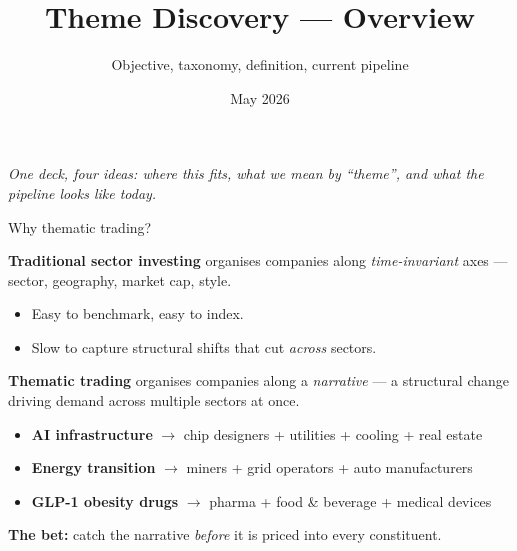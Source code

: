 \documentclass[10pt,aspectratio=169]{beamer}
\title{Theme Discovery --- Overview}
\subtitle{Objective, taxonomy, definition, current pipeline}
\date{May 2026}
\begin{document}
\begin{frame}[plain]
  \titlepage
  \vspace{-0.6cm}
  \centering\small
  \emph{One deck, four ideas: where this fits, what we mean by ``theme'',
  and what the pipeline looks like today.}
\end{frame}


\begin{frame}{Why thematic trading?}
  \footnotesize

  \textbf{Traditional sector investing} organises companies along
  \emph{time-invariant} axes --- sector, geography, market cap, style.
  \begin{itemize}\setlength\itemsep{0.04cm}
    \item Easy to benchmark, easy to index.
    \item Slow to capture structural shifts that cut \emph{across} sectors.
  \end{itemize}

  \vspace{0.30cm}
  \textbf{Thematic trading} organises companies along a \emph{narrative} ---
  a structural change driving demand across multiple sectors at once.
  \begin{itemize}\setlength\itemsep{0.04cm}
    \item \textbf{AI infrastructure} $\rightarrow$ chip designers + utilities + cooling + real estate
    \item \textbf{Energy transition} $\rightarrow$ miners + grid operators + auto manufacturers
    \item \textbf{GLP-1 obesity drugs} $\rightarrow$ pharma + food \& beverage + medical devices
  \end{itemize}

  \vspace{0.30cm}
  \begin{tcolorbox}[colback=corplight, colframe=corplight,
                    boxrule=0pt, arc=2pt,
                    left=10pt, right=10pt, top=5pt, bottom=5pt]
    \centering\footnotesize
    \textbf{The bet:} catch the narrative \emph{before} it is priced into every constituent.
  \end{tcolorbox}

\end{frame}
\end{document}
